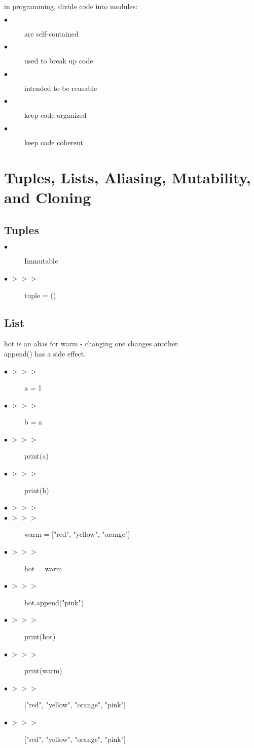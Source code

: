 \documentclass[letterpaper,12pt]{article}
\begin{document}
in programming, divide code into modules:

\begin{description}
	
	\item[$\bullet$ ] are self-contained
	\item[$\bullet$ ] used to break up code
	\item[$\bullet$ ] intended to be reusable
		\item[$\bullet$ ] keep code organized
		\item[$\bullet$ ] keep code coherent
		
	
\end{description}


\section{Tuples, Lists, Aliasing, Mutability, and Cloning}


\subsection{Tuples}


\begin{description}
	
	\item[$\bullet$ ] Immutable
	\item[$\bullet$ $>>>$ ] tuple = ()
	
	
\end{description}







\subsection{List}

hot is an alias for warm - changing one changes another. \\
append() has a side effect.



\begin{description}
	
	\item[$\bullet$ $>>>$ ] a = 1
	\item[$\bullet$ $>>>$ ] b = a
\item[$\bullet$ $>>>$ ] print(a)
\item[$\bullet$ $>>>$ ] print(b)
\item[$\bullet$ $>>>$ ] 
\item[$\bullet$ $>>>$ ] warm = ["red", "yellow", "orange"]
\item[$\bullet$ $>>>$ ] hot = warm
\item[$\bullet$ $>>>$ ] hot.append("pink")
\item[$\bullet$ $>>>$ ] print(hot)
\item[$\bullet$ $>>>$ ] print(warm)
\item[$\bullet$ $>>>$ ]	["red", "yellow", "orange", "pink"]
\item[$\bullet$ $>>>$ ]	["red", "yellow", "orange", "pink"]
\end{description}
\end{document}
